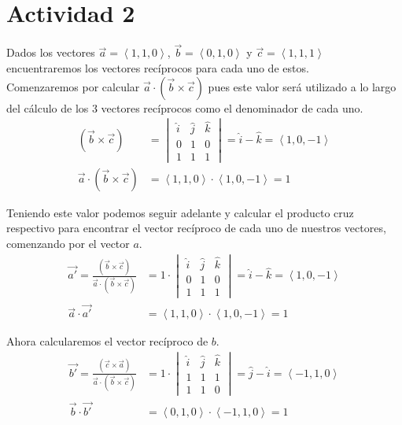 \documentclass{article}
\newcommand{\custvec}[1]{\left\langle#1\right\rangle}
\begin{document}
\section{Actividad 2}
Dados los vectores $\vec{a}=\custvec{1,1,0}$, $\vec{b}=\custvec{0,1,0}$ y $\vec{c}=\custvec{1,1,1}$ encuentraremos los vectores recíprocos para cada uno de estos.\\

Comenzaremos por calcular $\vec{a}\cdot (\vec{b}\times \vec{c})$ pues este valor será utilizado a lo largo del cálculo de los 3 vectores recíprocos como el denominador de cada uno.\\
\begin{equation*}
    \begin{split}
        (\vec{b}\times \vec{c}) &= \begin{vmatrix}
        \hat{i} & \hat{j} & \hat{k} \\
        0 & 1 & 0 \\
        1 & 1 & 1
        \end{vmatrix} = \hat{i} - \hat{k} = \custvec{1,0,-1}\\
        \vec{a}\cdot (\vec{b}\times \vec{c}) &= \custvec{1,1,0} \cdot \custvec{1,0,-1} = 1
    \end{split}
\end{equation*}

Teniendo este valor podemos seguir adelante y calcular el producto cruz respectivo para encontrar el vector recíproco de cada uno de nuestros vectores, comenzando por el vector $a$.\\
\begin{equation*}
    \begin{split}
        \vec{a'} = \frac{(\vec{b}\times \vec{c})}{\vec{a}\cdot (\vec{b}\times \vec{c})} &= 1\cdot \begin{vmatrix}
        \hat{i} & \hat{j} & \hat{k} \\
        0 & 1 & 0 \\
        1 & 1 & 1
        \end{vmatrix} = \hat{i} - \hat{k} = \custvec{1,0,-1}\\
        \vec{a}\cdot \vec{a'} &= \custvec{1,1,0}\cdot \custvec{1,0,-1} = 1 
    \end{split}
\end{equation*}

Ahora calcularemos el vector recíproco de $b$.
\begin{equation*}
    \begin{split}
        \vec{b'} = \frac{(\vec{c}\times \vec{a})}{\vec{a}\cdot (\vec{b}\times \vec{c})} &= 1\cdot \begin{vmatrix}
        \hat{i} & \hat{j} & \hat{k} \\
        1 & 1 & 1 \\
        1 & 1 & 0
        \end{vmatrix} = \hat{j} - \hat{i} = \custvec{-1,1,0}\\
        \vec{b}\cdot \vec{b'} &= \custvec{0,1,0}\cdot \custvec{-1,1,0} = 1 
    \end{split}
\end{equation*}
\end{document}
